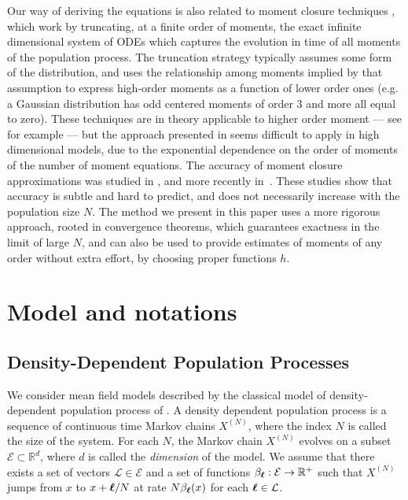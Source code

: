\documentclass[sigconf]{acmart}
\newcommand\XN{X^{(N)}}
\newcommand\bl{{\text{\boldmath$\ell$}}}
\newcommand\E{\mathcal{E}}
\newcommand\R{\mathbb{R}}
\newcommand\calL{\mathcal{L}}
\begin{document}
Our way of deriving the equations is also related to moment closure techniques \cite{gillespie2009moment}, which work by truncating, at a finite order of moments, the exact infinite dimensional system of ODEs which captures the evolution in time of all moments of the population process. The truncation strategy typically assumes some form of the distribution, and uses the relationship among moments implied by that assumption to express high-order moments as a function of lower order ones (e.g. a Gaussian distribution has odd centered moments of order 3 and more all equal to zero). 
These techniques are in theory applicable to higher order moment --- see for example
\cite{ale2013general} --- but the approach presented in \cite{ale2013general} seems difficult to apply in high dimensional models, due to the exponential dependence on the order of moments of the number of moment equations. 
The accuracy of moment closure approximations was studied in \cite{grima2012study}, and more recently in~\cite{schnoerr2014,schnoerr2015}. These studies show that accuracy is subtle and hard to predict, and does not necessarily increase with the population size $N$. 
The method we present in this paper uses a more rigorous approach, rooted in convergence theorems, which guarantees exactness in the limit of large $N$, and can also be used to provide estimates of moments of any order without extra effort, by choosing proper functions $h$.






\section{Model and notations}
\label{sec:model}

\subsection{Density-Dependent Population Processes}

We consider mean field models described by the classical model of
density-dependent population process of \cite{kurtz70}. A density
dependent population process is a sequence of continuous time Markov
chains $\XN$, where the index $N$ is called the size of the
system. For each $N$, the Markov chain $\XN$ evolves on a subset
$\E\subset\R^d$, where $d$ is called the \emph{dimension} of the
model. We assume that there exists a set of vectors $\calL\in \E$ and
a set of functions $\beta_\bl:\E\to\R^+$ such that $\XN$ jumps from
$x$ to $x+\bl/N$ at rate $N \beta_\bl(x)$ for each $\bl\in\calL$.
\end{document}
